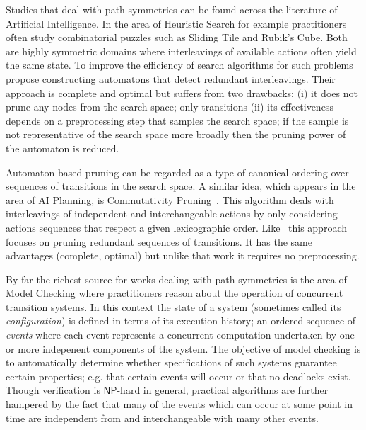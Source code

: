 Studies that deal with path symmetries can be found across the literature of Artificial Intelligence.
In the area of Heuristic Search for example practitioners often study combinatorial puzzles such as Sliding 
Tile and Rubik's Cube. Both are highly symmetric domains where interleavings of available
actions often yield the same state. To improve the efficiency of search algorithms for such problems
~\cite{taylor93} propose constructing automatons that detect redundant interleavings.
Their approach is complete and optimal but suffers from two drawbacks: (i) it does not prune any nodes
from the search space; only transitions (ii) its effectiveness depends on a preprocessing step that
samples the search space; if the sample is not representative of the search space more broadly then
the pruning power of the automaton is reduced.

Automaton-based pruning can be regarded as a type of canonical ordering over sequences of 
transitions in the search space. A similar idea, which appears in the area of AI Planning, is
Commutativity Pruning~\citep{haslum00}. This algorithm deals with interleavings of independent and 
interchangeable actions by only considering actions sequences that respect a given lexicographic 
order. Like~\citep{taylor93} this approach focuses on pruning redundant sequences of transitions.
It has the same advantages (complete, optimal) but unlike that work it requires no preprocessing.

By far the richest source for works dealing with path symmetries is the area of Model Checking
where practitioners reason about the operation of concurrent transition systems.  In this
context the state of a system (sometimes called its \emph{configuration}) is defined in terms of its
execution history; an ordered sequence of \emph{events} where each event represents a concurrent
computation undertaken by one or more indepenent components of the system.  The objective of model
checking is to automatically determine whether specifications of such systems guarantee certain
properties; e.g.  that certain events will occur or that no deadlocks exist.  Though verification is
$\mathsf{NP}$-hard in general, practical algorithms are further hampered by the fact that many of
the events which can occur at some point in time are independent from and interchangeable with many
other events.


